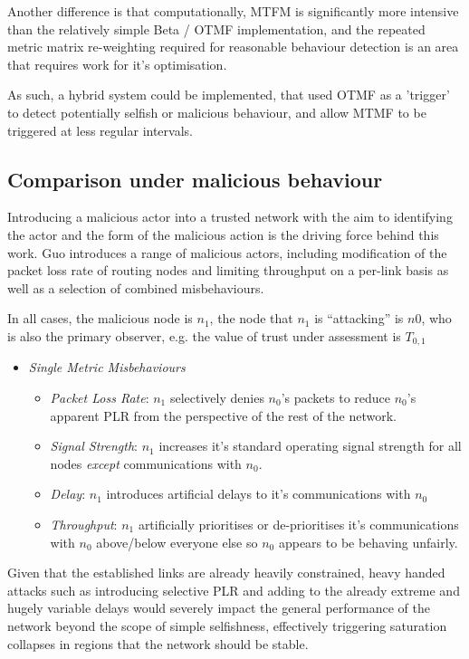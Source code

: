 \documentclass[runningheads,a4paper]{llncs}
\begin{document}
Another difference is that computationally, MTFM is significantly more intensive than the relatively simple Beta / OTMF implementation, and the repeated metric matrix re-weighting required for reasonable behaviour detection is an area that requires work for it's optimisation.

As such, a hybrid system could be implemented, that used OTMF as a 'trigger' to detect potentially selfish or malicious behaviour, and allow MTMF to be triggered at less regular intervals.

\subsection{Comparison under malicious behaviour}

Introducing a malicious actor into a trusted network with the aim to identifying the actor and the form of the malicious action is the driving force behind this work. 
Guo introduces a range of malicious actors, including modification of the packet loss rate of routing nodes and limiting throughput on a per-link basis as well as a selection of combined misbehaviours. 

In all cases, the malicious node is $n_1$, the node that $n_1$ is ``attacking'' is $n0$, who is also the primary observer, e.g. the value of trust under assessment is $T_{0,1}$
\begin{itemize}
  \item \emph{Single Metric Misbehaviours}
    \begin{itemize}
      \item \emph{Packet Loss Rate}: $n_1$ selectively denies $n_0$'s packets to reduce $n_0$'s apparent PLR from the perspective of the rest of the network.
      \item \emph{Signal Strength}: $n_1$ increases it's standard operating signal strength for all nodes \emph{except} communications with $n_0$.
      \item \emph{Delay}: $n_1$ introduces artificial delays to it's communications with $n_0$
      \item \emph{Throughput}: $n_1$ artificially prioritises or de-prioritises it's communications with $n_0$ above/below everyone else so $n_0$ appears to be behaving unfairly.
    \end{itemize}
\end{itemize}

Given that the established links are already heavily constrained, heavy handed attacks such as introducing selective PLR and adding to the already extreme and hugely variable delays would severely impact the general performance of the network beyond the scope of simple selfishness, effectively triggering saturation collapses in regions that the network should be stable.
\end{document}
